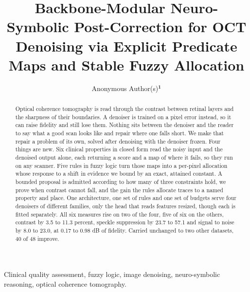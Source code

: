 \documentclass{ieeetj}
\def\authorrefmark#1{\ensuremath{^{\textbf{#1}}}}
\begin{document}
\receiveddate{}
\reviseddate{}
\accepteddate{}
\publisheddate{}
\currentdate{}
\doiinfo{}
\title{Backbone-Modular Neuro-Symbolic Post-Correction for OCT Denoising via Explicit Predicate Maps and Stable Fuzzy Allocation}
\author{Anonymous Author(s)\authorrefmark{1}}
\affil{\authorrefmark{1} Anonymous Affiliation}

\begin{abstract}
Optical coherence tomography is read through the contrast between retinal layers and the sharpness of
their boundaries. A denoiser is trained on a pixel error instead, so it can raise fidelity and still
lose them. Nothing sits between the denoiser and the reader to say what a
good scan looks like and repair where one falls short. We make that repair a problem of its
own, solved after denoising with the denoiser frozen. Four things are new. Six clinical properties in closed
form read the noisy input and the denoised output alone, each returning a score and a map of where it
fails, so they run on any scanner. Five rules in fuzzy logic turn those maps into a per-pixel
allocation whose response to a shift in evidence we bound by an exact, attained constant. A bounded proposal is admitted according to how many of three constraints hold, we prove when
contrast cannot fall, and the gain the rules allocate traces to a named property and place. One architecture, one set of rules and one set of budgets serve four denoisers of
different families, only the head that reads features resized, though each is fitted separately. All six measures rise on two of the four, five of six on the others,
contrast by 3.5 to 11.3 percent, speckle suppression by 23.7 to 57.1 and signal to noise by 8.0 to
23.0, at 0.17 to 0.98 dB of fidelity. Carried unchanged to two other datasets, 40 of 48 improve.
\end{abstract}

\begin{IEEEkeywords}
Clinical quality assessment, fuzzy logic, image denoising, neuro-symbolic reasoning, optical
coherence tomography.
\end{IEEEkeywords}

\maketitle










\end{document}
